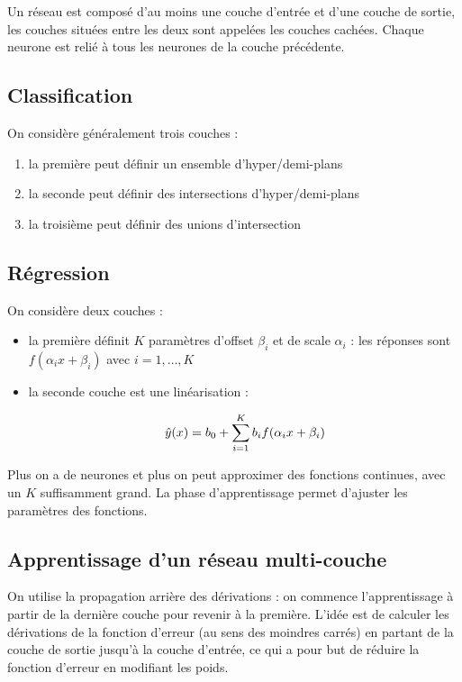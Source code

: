 Un réseau est composé d'au moins une couche d'entrée et d'une couche de sortie, les couches situées entre les deux sont appelées les couches cachées. Chaque neurone est relié à tous les neurones de la couche précédente.

	\subsection{Classification}
	
	On considère généralement trois couches :
	
	\begin{enumerate}
		\item la première peut définir un ensemble d'hyper/demi-plans
		\item la seconde peut définir des intersections d'hyper/demi-plans
		\item la troisième peut définir des unions d'intersection
	\end{enumerate}
	
	
	\subsection{Régression}
	
	On considère deux couches :
	
	\begin{itemize}
		\item la première définit $K$ paramètres d'offset $\beta_i$ et de scale $\alpha_i$ : les réponses sont $f(\alpha_i x + \beta_i)$ avec $i = 1, \dots , K$
		\item la seconde couche est une linéarisation :
		
		$$\hat{y}(x) = b_0 + \sum_{i = 1}^K b_i f(\alpha_i x + \beta_i)$$
	\end{itemize}
	
	
	Plus on a de neurones et plus on peut approximer des fonctions continues, avec un $K$ suffisamment grand. La phase d'apprentissage permet d'ajuster les paramètres des fonctions.
	
	\subsection{Apprentissage d'un réseau multi-couche}
	
	On utilise la propagation arrière des dérivations : on commence l'apprentissage à partir de la dernière couche pour revenir à la première. L'idée est de calculer les dérivations de la fonction d'erreur (au sens des moindres carrés) en partant de la couche de sortie jusqu'à la couche d'entrée, ce qui a pour but de réduire la fonction d'erreur en modifiant les poids.
	
